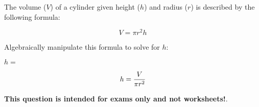 

The volume ($V$) of a cylinder given height ($h$) and radius ($r$) is described by the following formula:

$$V = \pi r^2 h$$

Algebraically manipulate this formula to solve for $h$:

\vskip 20pt

$h = $







$$h = {V \over {\pi r^2}}$$







{\bf This question is intended for exams only and not worksheets!}.



